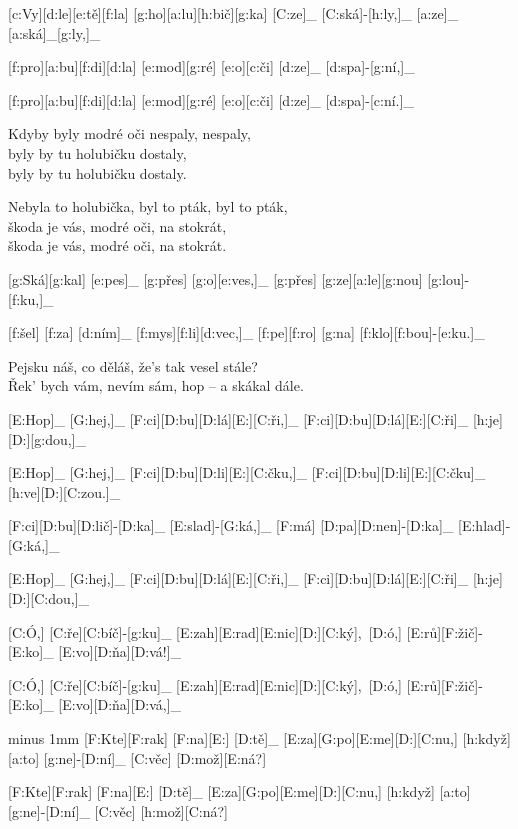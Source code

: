 [c:Vy][d:le][e:tě][f:la] [g:ho][a:lu][h:bič][g:ka] %
[C:ze]_ [C:ská]-[h:ly,]_ [a:ze]_ [a:ská]_[g:ly,]_

[f:pro][a:bu][f:di][d:la] [e:mod][g:ré] [e:o][c:či] %
[d:ze]_ [d:spa]-[g:ní,]_

[f:pro][a:bu][f:di][d:la] [e:mod][g:ré] [e:o][c:či] %
[d:ze]_ [d:spa]-[c:ní.]_

Kdyby byly modré oči nespaly, nespaly,\\
byly by tu holubičku dostaly,\\
byly by tu holubičku dostaly.

Nebyla to holubička, byl to pták, byl to pták,\\
škoda je vás, modré oči, na stokrát,\\
škoda je vás, modré oči, na stokrát.



[g:Ská][g:kal] [e:pes]_ [g:přes] [g:o][e:ves,]_
[g:přes] [g:ze][a:le][g:nou] [g:lou]-[f:ku,]_

[f:šel] [f:za] [d:ním]_ [f:mys][f:li][d:vec,]_
[f:pe][f:ro] [g:na] [f:klo][f:bou]-[e:ku.]_

Pejsku náš, co děláš,
že's tak vesel stále?\\
Řek' bych vám, nevím sám,
hop -- a skákal dále.



[E:Hop]_ [G:hej,]_ [F:ci][D:bu][D:lá][E:][C:ři,]_
[F:ci][D:bu][D:lá][E:][C:ři]_ [h:je][D:][g:dou,]_

[E:Hop]_ [G:hej,]_ [F:ci][D:bu][D:li][E:][C:čku,]_
[F:ci][D:bu][D:li][E:][C:čku]_ [h:ve][D:][C:zou.]_

[F:ci][D:bu][D:lič]-[D:ka]_ [E:slad]-[G:ká,]_
[F:má] [D:pa][D:nen]-[D:ka]_ [E:hlad]-[G:ká,]_

[E:Hop]_ [G:hej,]_ [F:ci][D:bu][D:lá][E:][C:ři,]_
[F:ci][D:bu][D:lá][E:][C:ři]_ [h:je][D:][C:dou,]_



[C:Ó,] [C:ře][C:bíč]-[g:ku]_ [E:zah][E:rad][E:nic][D:][C:ký],\
[D:ó,] [E:rů][F:žič]-[E:ko]_ [E:vo][D:ňa][D:vá!]_

[C:Ó,] [C:ře][C:bíč]-[g:ku]_ [E:zah][E:rad][E:nic][D:][C:ký],\
[D:ó,] [E:rů][F:žič]-[E:ko]_ [E:vo][D:ňa][D:vá,]_

{\minw=4.2mm
\pskip=3mm minus 1mm
[F:Kte][F:rak] [F:na][E:] [D:tě]_ [E:za][G:po][E:me][D:][C:nu,] %
[h:když] [a:to] [g:ne]-[D:ní]_ [C:věc] [D:mož][E:ná?] %

[F:Kte][F:rak] [F:na][E:] [D:tě]_ [E:za][G:po][E:me][D:][C:nu,] %
[h:když] [a:to] [g:ne]-[D:ní]_ [C:věc] [h:mož][C:ná?] %
}

